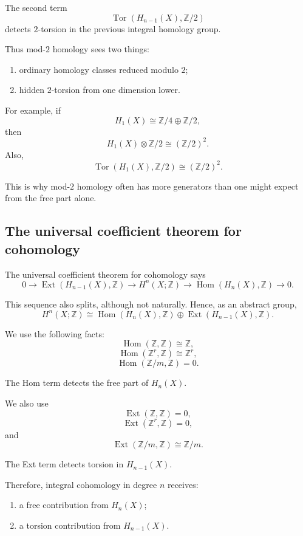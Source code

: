 \documentclass[12pt,a4paper]{article}
\theoremstyle{notespace}
\begin{document}
The second term
\[
\operatorname{Tor}(H_{n-1}(X),\mathbb Z/2)
\]
detects \(2\)-torsion in the previous integral homology group.

Thus mod-\(2\) homology sees two things:
\begin{enumerate}
	\item ordinary homology classes reduced modulo \(2\);
	\item hidden \(2\)-torsion from one dimension lower.
\end{enumerate}

For example, if
\[
H_1(X)\cong \mathbb Z/4\oplus \mathbb Z/2,
\]
then
\[
H_1(X)\otimes \mathbb Z/2
\cong
(\mathbb Z/2)^2.
\]
Also,
\[
\operatorname{Tor}(H_1(X),\mathbb Z/2)
\cong
(\mathbb Z/2)^2.
\]

This is why mod-\(2\) homology often has more generators than one might expect from the free part alone.

\subsection{The universal coefficient theorem for cohomology}

The universal coefficient theorem for cohomology says
\[
0
\longrightarrow
\operatorname{Ext}(H_{n-1}(X),\mathbb Z)
\longrightarrow
H^n(X;\mathbb Z)
\longrightarrow
\operatorname{Hom}(H_n(X),\mathbb Z)
\longrightarrow
0.
\]

This sequence also splits, although not naturally. Hence, as an abstract group,
\[
H^n(X;\mathbb Z)
\cong
\operatorname{Hom}(H_n(X),\mathbb Z)
\oplus
\operatorname{Ext}(H_{n-1}(X),\mathbb Z).
\]

We use the following facts:
\[
\operatorname{Hom}(\mathbb Z,\mathbb Z)\cong \mathbb Z,
\]
\[
\operatorname{Hom}(\mathbb Z^r,\mathbb Z)\cong \mathbb Z^r,
\]
\[
\operatorname{Hom}(\mathbb Z/m,\mathbb Z)=0.
\]

The Hom term detects the free part of \(H_n(X)\).

We also use
\[
\operatorname{Ext}(\mathbb Z,\mathbb Z)=0,
\]
\[
\operatorname{Ext}(\mathbb Z^r,\mathbb Z)=0,
\]
and
\[
\operatorname{Ext}(\mathbb Z/m,\mathbb Z)\cong \mathbb Z/m.
\]

The Ext term detects torsion in \(H_{n-1}(X)\).

Therefore, integral cohomology in degree \(n\) receives:
\begin{enumerate}
	\item a free contribution from \(H_n(X)\);
	\item a torsion contribution from \(H_{n-1}(X)\).
\end{enumerate}
\end{document}
